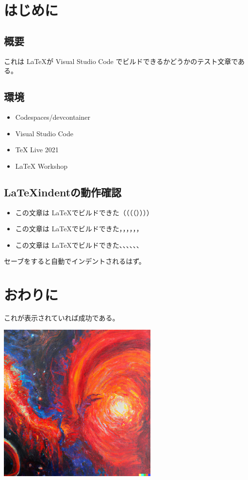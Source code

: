 \documentclass[12pt]{jreport}
\begin{document}
  \chapter{はじめに}
    \section{概要}
      これは \LaTeX が Visual Studio Code でビルドできるかどうかのテスト文章である。
		\section{環境}
			\begin{itemize}
				\item Codespaces/devcontainer
				\item Visual Studio Code
				\item TeX Live 2021
				\item LaTeX Workshop
			\end{itemize}
		\section{\LaTeX indentの動作確認}
			\begin{itemize}
				\item この文章は \LaTeX でビルドできた（（（（））））
				\item この文章は \LaTeX でビルドできた，，，，，，
				\item この文章は \LaTeX でビルドできた、、、、、、
			\end{itemize}
			セーブをすると自動でインデントされるはず。
  \chapter{おわりに}
    これが表示されていれば成功である。

		\includegraphics*[width=8cm]{./images/photo.png}
\end{document}
